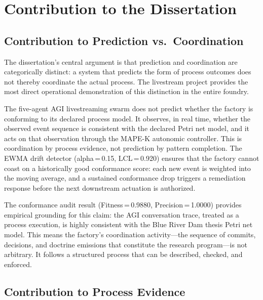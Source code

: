 
\section{Contribution to the Dissertation}
\label{sec:livestream-contribution}

\subsection{Contribution to Prediction vs.~Coordination}
\label{sec:livestream-contribution-prediction}

The dissertation's central argument is that prediction and coordination are
categorically distinct: a system that predicts the form of process outcomes does
not thereby coordinate the actual process. The livestream project provides the
most direct operational demonstration of this distinction in the entire foundry.

The five-agent AGI livestreaming swarm does not predict whether the factory is
conforming to its declared process model. It observes, in real time, whether the
observed event sequence is consistent with the declared Petri net model, and it
acts on that observation through the MAPE-K autonomic controller. This is
coordination by process evidence, not prediction by pattern completion. The EWMA
drift detector (alpha\,=\,0.15, LCL\,=\,0.920) ensures that the factory cannot
coast on a historically good conformance score: each new event is weighted into
the moving average, and a sustained conformance drop triggers a remediation
response before the next downstream actuation is authorized.

The conformance audit result (Fitness\,=\,0.9880, Precision\,=\,1.0000) provides
empirical grounding for this claim: the AGI conversation trace, treated as a process
execution, is highly consistent with the Blue River Dam thesis Petri net model.
This means the factory's coordination activity---the sequence of commits, decisions,
and doctrine emissions that constitute the research program---is not arbitrary. It
follows a structured process that can be described, checked, and enforced.

\subsection{Contribution to Process Evidence}
\label{sec:livestream-contribution-evidence}

